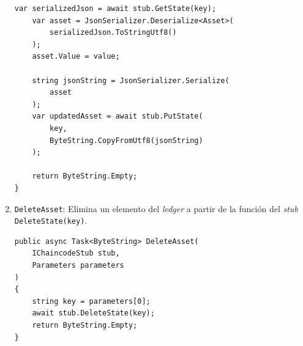 \begin{enumerate}
\begin{lstlisting}[caption={Función \texttt{UpdateAsset(...)}}]
    var serializedJson = await stub.GetState(key);
    var asset = JsonSerializer.Deserialize<Asset>(
    	serializedJson.ToStringUtf8()
    );
    asset.Value = value;
    
    string jsonString = JsonSerializer.Serialize(
    	asset
    );
    var updatedAsset = await stub.PutState(
    	key,
    	ByteString.CopyFromUtf8(jsonString)
    );
    
    return ByteString.Empty;
}
\end{lstlisting}

\item \texttt{DeleteAsset}: Elimina un elemento del \textit{ledger} a partir de la función del \textit{stub} \texttt{DeleteState(key)}.\\

\begin{lstlisting}[caption={Función \texttt{DeleteAsset(...)}}]
public async Task<ByteString> DeleteAsset(
	IChaincodeStub stub,
	Parameters parameters
)
{
    string key = parameters[0];
    await stub.DeleteState(key); 
    return ByteString.Empty;
}
\end{lstlisting}
\end{enumerate}







%
%
%
%




